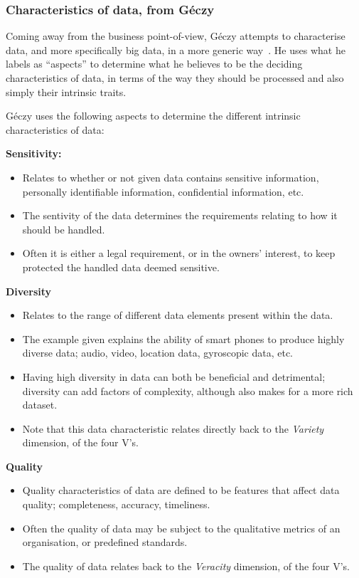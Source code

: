 \documentclass[a4paper,11pt]{article}
\begin{document}


\subsubsection{Characteristics of data, from G\'eczy} %
\label{ssub:characteristics_of_data_from_ge_czy}

Coming away from the business point-of-view, G\'eczy attempts to characterise data, and more specifically big data,  in
a more generic way~\cite{geczy_big_2014}. He uses what he labels as ``aspects'' to determine what he believes to be the
deciding characteristics of data, in terms of the way they should be processed and also simply their intrinsic traits.

G\'eczy uses the following aspects to determine the different intrinsic characteristics of data:

\textbf{Sensitivity:}

\begin{itemize}
  \item Relates to whether or not given data contains sensitive information, \ie{}personally identifiable information,
  confidential information, etc.
  \item The sentivity of the data determines the requirements relating to how it should be handled.
  \item Often it is either a legal requirement, or in the owners' interest, to keep protected the handled data deemed sensitive.
\end{itemize}


\textbf{Diversity}

\begin{itemize}
  \item Relates to the range of different data elements present within the data.
  \item The example given explains the ability of smart phones to produce highly diverse data; \eg{}audio, video, location
  data, gyroscopic data, etc.
  \item Having high diversity in data can both be beneficial and detrimental; diversity can add factors of complexity,
  although also makes for a more rich dataset.
  \item Note that this data characteristic relates directly back to the \emph{Variety} dimension, of the four V's.
\end{itemize}


\textbf{Quality}

\begin{itemize}
  \item Quality characteristics of data are defined to be features that affect data quality; \eg{}completeness, accuracy,
  timeliness.
  \item Often the quality of data may be subject to the qualitative metrics of an organisation, or predefined standards.
  \item The quality of data relates back to the \emph{Veracity} dimension, of the four V's.
\end{itemize}
\end{document}

